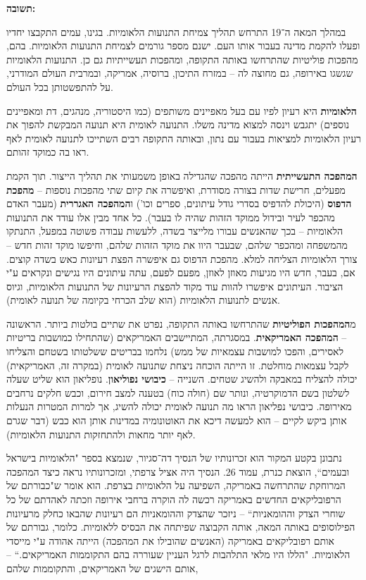 \documentclass[]{article}
\begin{document}
		\textbf{תשובה: }
		
		במהלך המאה ה־19 התרחש תהליך צמיחת התנועות הלאומיות. בגינו, עמים התקבצו יחדיו ופעלו להקמת מדינה בעבור אותו העם. ישנם מספר גורמים לצמיחת התנועות הלאומיות. בהם, מהפכות פוליטיות שהתרחשו באותה התקופה, ומהפכות תעשייתיות גם כן. התנועות הלאומיות שגשגו באירופה, גם מחוצה לה – במזרח התיכון, ברוסיה, אמריקה, ובמרבית העולם המודרני, על להתפשטותן בכל העולם. 
		
		\textbf{הלאומיות} היא רעיון לפיו עם בעל מאפיינים משותפים (כמו היסטוריה, מנהגים, דת ומאפיינים נוספים) יתגבש וינסה למצוא מדינה משלו. התנועה לאומית היא תנועה המבקשת להפוך את רעיון הלאומיות למציאות בעבור עם נתון, ובאותה התקופה רבים השתייכו לתנועה לאומית לאף ראו בה כמוקד זהותם. 
		
		\textbf{המהפכה התעשייתית} הייתה מהפכה שהגדילה באופן משמעותי את תהליך הייצור. תוך הקמת מפעלים, חרישת שדות בצורה מסודרת, ואיפשרה את קיום שתי מהפכות נוספות – \textbf{מהפכת הדפוס} (היכולת להדפיס בסדרי גודל עיתונים, ספרים וכו') ו\textbf{המהפכה האגררית} (מעבר האדם מהכפר לעיר ובידול ממוקד הזהות שהיה לו בעבר). כל אחד מבין אלו עודד את התנועות הלאומיות – בכך שהאנשים עבורו מלייצר בשדה, ללעשות עבודה פשוטה במפעל, התנתקו מהמשפחה ומהכפר שלהם, שבעבר היוו את מוקד הזהות שלהם, וחיפשו מוקד זהות חדש – צורך הלאומיות הצליחה למלא. מהפכת הדפוס גם איפשרה הפצת רעיונות כאש בשדה קוצים. אם, בעבר, חדש היו מגיעות מאוזן לאוזן, מפעם לפעם, עתה עיתונים היו נגישים ונקראים ע"י הציבור. העיתונים איפשרו להוות עוד מקוד להפצת הרעיונות של התנועות הלאומיות, וגיוס אנשים לתנועות הלאומיות (הוא שלב הכרחי בקיומה של תנועה לאומית). 
		
		מ\textbf{המהפכות הפוליטיות} שהתרחשו באותה התקופה, נפרט את שתיים בולטות ביותר. הראשונה – \textbf{המהפכה האמריקאית}. במסגרתה, המתיישבים האמריקאים (שהתחילו כמושבות בריטיות לאסירים, והפכו למושבות עצמאיות של ממש) נלחמו בבריטים ששלטותו בשטחם והצליחו לקבל עצמאות מוחלטת. זו הייתה הוכחה ניצחת שתנועה לאומית (במקרה זה, האמריקאית) יכולה להצליח במאבקה ולהשיג שטחים. השנייה – \textbf{כיבושי נפוליאון}. נופליאון הוא שליט שעלה לשלטון בשם הדמוקרטיה, ונותר שם (חולה כוח) בטענה למצב חירום, וכבש חלקים נרחבים מאירופה. כיבושי נפליאון הראו מה תנועה לאומית יכולה להשיג, אך למרות המטרות הנעלות אותן ביקש לקיים – הוא למעשה דיכא את האוטונומיה במדינות אותן הוא כבש (דבר שגרם לאף יותר מחאות ולהתחזקות התנועות הלאומיות). 
		
		נתבונן בקטע המקור הוא זכרונותיו של הנסיך דה־סגיור, שנמצא בספר "הלאומיות בישראל ובעמים``, הוצאת כנרת, עמוד 26. הנסיך היה אציל צרפתי, ומזכרונותיו נראה כיצד המהפכה המרוחקת שהתרחשה באמריקה, השפיעה על הלאומיות בצרפת. הוא אומר ש"כבורתם של הרפובליקאים החדשים באמריקה רכשה לה הוקרה ברחבי אירופה וזכתה לאהדתם של כל שוחרי הצדק וההומאניות`` – ניזכר שהצדק וההומאניות הם רעיונות שהבאו כחלק מרעיונות הפילוסופים באותה המאה, אותה הקבוצה שפיתחה את הבסיס ללאומיות. כלומר, גבורתם של אותם רפובליקאים באמריקה (האנשים שהובילו את המהפכה) הייתה אהודה ע"י מייסדי הלאומיות. "הללו היו מלאי התלהבות לרגל העניין שעוררה בהם התקוממות האמריקאים.`` – אותם הישגים של האמריקאים, והתקוממות שלהם, 
		
		
		
		
\end{document}
